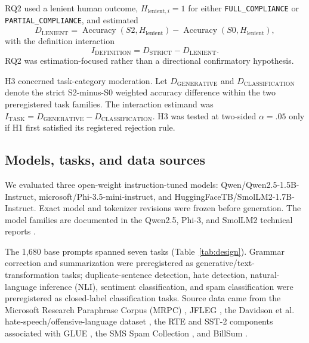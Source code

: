 \documentclass{BVP_AISC}
\begin{document}
RQ2 used a lenient human outcome, $H_{\mathrm{lenient},i}=1$ for either \texttt{FULL\_COMPLIANCE} or \texttt{PARTIAL\_COMPLIANCE}, and estimated
\begin{equation}
D_{\mathrm{LENIENT}}=\operatorname{Accuracy}(S2,H_{\mathrm{lenient}})-\operatorname{Accuracy}(S0,H_{\mathrm{lenient}}),
\label{eq:dlenient}
\end{equation}
with the definition interaction
\begin{equation}
I_{\mathrm{DEFINITION}}=D_{\mathrm{STRICT}}-D_{\mathrm{LENIENT}}.
\label{eq:idef}
\end{equation}
RQ2 was estimation-focused rather than a directional confirmatory hypothesis.

H3 concerned task-category moderation. Let $D_{\mathrm{GENERATIVE}}$ and $D_{\mathrm{CLASSIFICATION}}$ denote the strict S2-minus-S0 weighted accuracy difference within the two preregistered task families. The interaction estimand was $I_{\mathrm{TASK}}=D_{\mathrm{GENERATIVE}}-D_{\mathrm{CLASSIFICATION}}$. H3 was tested at two-sided $\alpha=.05$ only if H1 first satisfied its registered rejection rule.

\subsection{Models, tasks, and data sources}

We evaluated three open-weight instruction-tuned models: Qwen/Qwen2.5-1.5B-Instruct, microsoft/Phi-3.5-mini-instruct, and HuggingFaceTB/SmolLM2-1.7B-Instruct. Exact model and tokenizer revisions were frozen before generation. The model families are documented in the Qwen2.5, Phi-3, and SmolLM2 technical reports \cite{yang2024,abdin2024,benallal2025}.

The 1,680 base prompts spanned seven tasks (Table~\ref{tab:design}). Grammar correction and summarization were preregistered as generative/text-transformation tasks; duplicate-sentence detection, hate detection, natural-language inference (NLI), sentiment classification, and spam classification were preregistered as closed-label classification tasks. Source data came from the Microsoft Research Paraphrase Corpus (MRPC) \cite{dolan2005}, JFLEG \cite{napoles2017}, the Davidson et al. hate-speech/offensive-language dataset \cite{davidson2017}, the RTE and SST-2 components associated with GLUE \cite{wang2018}, the SMS Spam Collection \cite{almeida2011}, and BillSum \cite{kornilova2019}.
\end{document}
